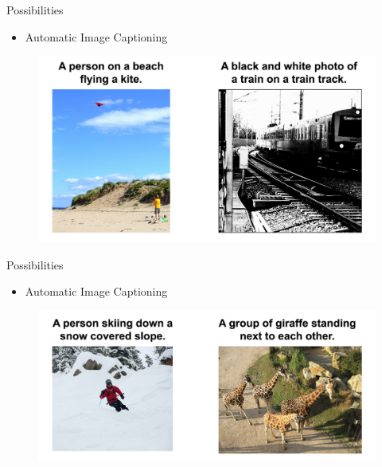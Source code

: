 \documentclass[10pt]{beamer}
\begin{document}
	\begin{frame}[t]{Possibilities}
		\begin{itemize}
			\item \large{Automatic Image Captioning}
		\end{itemize}
		\begin{figure}
		\includegraphics[width=\linewidth]{images/ic}
		\end{figure}
	\end{frame}
	\begin{frame}[t]{Possibilities}
		\begin{itemize}
			\item \large{Automatic Image Captioning}
		\end{itemize}
		\begin{figure}
			\includegraphics[width=\linewidth]{images/ic2}
		\end{figure}
	\end{frame}
\end{document}
